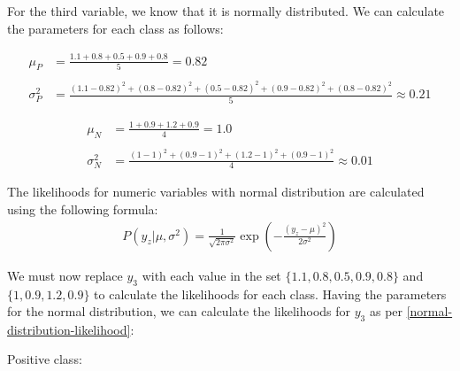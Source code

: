 \documentclass[12pt]{article}
\begin{document}
\begin{enumerate}[leftmargin=\labelsep]
    \vspace{10pt}
    For the third variable, we know that it is normally distributed. We can calculate the parameters for each class as follows:

    \begin{equation*}
        \begin{aligned}
            \mu_P &= \frac{1.1 + 0.8 + 0.5 + 0.9 + 0.8}{5} = 0.82 
            \\
            \\
            \sigma_P^2 &= \frac{(1.1 - 0.82)^2 + (0.8 - 0.82)^2 + (0.5 - 0.82)^2 + (0.9 - 0.82)^2 + (0.8 - 0.82)^2}{5} \approx 0.21
        \end{aligned}
    \end{equation*}

    \begin{equation*}
        \begin{aligned}
            \mu_N &= \frac{1 + 0.9 + 1.2 + 0.9}{4} = 1.0
            \\
            \\
            \sigma_N^2 &= \frac{(1 - 1)^2 + (0.9 - 1)^2 + (1.2 - 1)^2 + (0.9 - 1)^2}{4} \approx 0.01
        \end{aligned}
    \end{equation*}

    The likelihoods for numeric variables with normal distribution are calculated using the following formula:
    \begin{equation}\label{normal-distribution-likelihood}
        \begin{aligned}
            P(y_z|\mu, \sigma^2) = \frac{1}{\sqrt{2\pi \sigma^2}} \exp\left(-\frac{(y_z - \mu)^2}{2\sigma^2}\right)
        \end{aligned}
    \end{equation}

    \vspace{10pt}
    We must now replace $y_3$ with each value in the set $\{1.1, 0.8, 0.5, 0.9, 0.8\}$ and $\{1, 0.9, 1.2, 0.9\}$ 
    to calculate the likelihoods for each class.
    Having the parameters for the normal distribution, we can calculate the likelihoods for $y_3$ as per \eqref{normal-distribution-likelihood}:
    
    \vspace{10pt}
    Positive class:


\end{enumerate}
\end{document}
